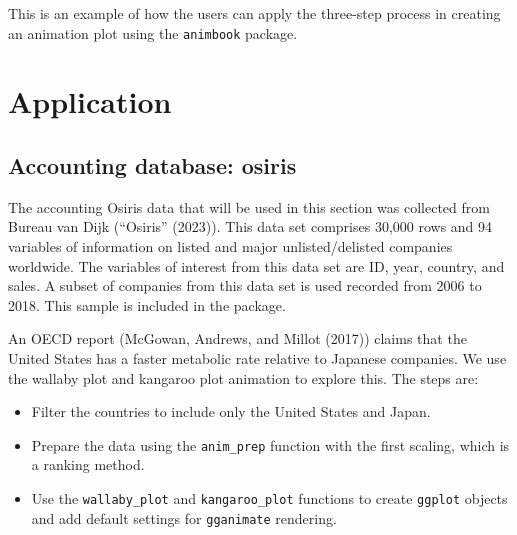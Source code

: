 This is an example of how the users can apply the three-step process in creating an animation plot using the \texttt{animbook} package.

\hypertarget{application}{%
\section{Application}\label{application}}

\hypertarget{accounting-database-osiris}{%
\subsection{Accounting database: osiris}\label{accounting-database-osiris}}

The accounting Osiris data that will be used in this section was collected from Bureau van Dijk ({``Osiris''} (2023)). This data set comprises 30,000 rows and 94 variables of information on listed and major unlisted/delisted companies worldwide. The variables of interest from this data set are ID, year, country, and sales. A subset of companies from this data set is used recorded from 2006 to 2018. This sample is included in the package.

An OECD report (McGowan, Andrews, and Millot (2017)) claims that the United States has a faster metabolic rate relative to Japanese companies. We use the wallaby plot and kangaroo plot animation to explore this. The steps are:

\begin{itemize}
\tightlist
\item
  Filter the countries to include only the United States and Japan.
\item
  Prepare the data using the \texttt{anim\_prep} function with the first scaling, which is a ranking method.
\item
  Use the \texttt{wallaby\_plot} and \texttt{kangaroo\_plot} functions to create \texttt{ggplot} objects and add default settings for \texttt{gganimate} rendering.
\end{itemize}

